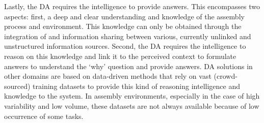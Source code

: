 Lastly, the DA requires the intelligence to provide answers. This encompasses two aspects: first, a deep and clear understanding and knowledge of the assembly process and environment. This knowledge can only be obtained through the integration of and information sharing between various, currently unlinked and unstructured information sources. Second, the DA requires the intelligence to reason on this knowledge and link it to the perceived context to formulate answers to understand the ‘why’ question and provide answers. DA solutions in other domains are based on data-driven methods that rely on vast (crowd-sourced) training datasets to provide this kind of reasoning intelligence and knowledge to the system. In assembly environments, especially in the case of high variability and low volume, these datasets are not always available because of low occurrence of some tasks.